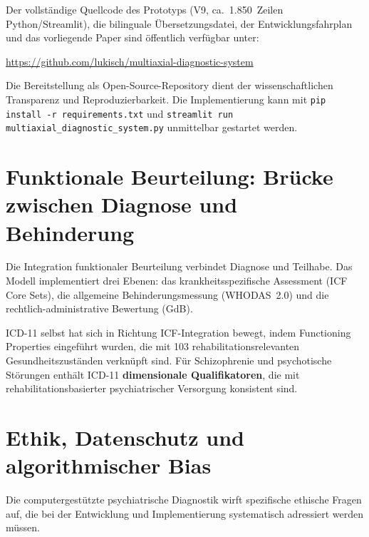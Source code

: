 \documentclass[11pt,a4paper]{article}
\begin{document}
Der vollst\"andige Quellcode des Prototyps (V9, ca.\ 1.850~Zeilen Python/Streamlit), die bilinguale \"Ubersetzungsdatei, der Entwicklungsfahrplan und das vorliegende Paper sind \"offentlich verf\"ugbar unter:

\begin{center}
\url{https://github.com/lukisch/multiaxial-diagnostic-system}
\end{center}

\noindent Die Bereitstellung als Open-Source-Repository dient der wissenschaftlichen Transparenz und Reproduzierbarkeit. Die Implementierung kann mit \texttt{pip install -r requirements.txt} und \texttt{streamlit run multiaxial\_diagnostic\_system.py} unmittelbar gestartet werden.


\section{Funktionale Beurteilung: Br\"ucke zwischen Diagnose und Behinderung}
\label{sec:funktional}

Die Integration funktionaler Beurteilung verbindet Diagnose und Teilhabe. Das Modell implementiert drei Ebenen: das krankheitsspezifische Assessment (ICF Core Sets), die allgemeine Behinderungsmessung (WHODAS~2.0) und die rechtlich-administrative Bewertung (GdB).

ICD-11 selbst hat sich in Richtung ICF-Integration bewegt, indem \glqq Functioning Properties\grqq{} eingef\"uhrt wurden, die mit 103 rehabilitationsrelevanten Gesundheitszust\"anden verkn\"upft sind. F\"ur Schizophrenie und psychotische St\"orungen enth\"alt ICD-11 \textbf{dimensionale Qualifikatoren}, die mit rehabilitationsbasierter psychiatrischer Versorgung konsistent sind.


\section{Ethik, Datenschutz und algorithmischer Bias}
\label{sec:ethik}

Die computergest\"utzte psychiatrische Diagnostik wirft spezifische ethische Fragen auf, die bei der Entwicklung und Implementierung systematisch adressiert werden m\"ussen.
\end{document}
